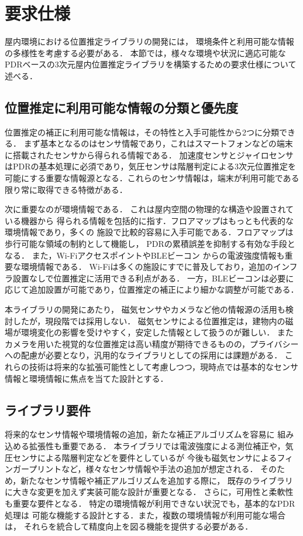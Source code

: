 

\section{要求仕様}

屋内環境における位置推定ライブラリの開発には，
環境条件と利用可能な情報の多様性を考慮する必要がある．
本節では，様々な環境や状況に適応可能なPDRベースの3次元屋内位置推定ライブラリを構築するための要求仕様について述べる．

\subsection{位置推定に利用可能な情報の分類と優先度}

位置推定の補正に利用可能な情報は，その特性と入手可能性から2つに分類できる．
まず基本となるのはセンサ情報であり，これはスマートフォンなどの端末に搭載されたセンサから得られる情報である．
加速度センサとジャイロセンサはPDRの基本処理に必須であり，気圧センサは階層判定による3次元位置推定を可能にする重要な情報源となる．これらのセンサ情報は，端末が利用可能である限り常に取得できる特徴がある．

次に重要なのが環境情報である．
これは屋内空間の物理的な構造や設置されている機器から
得られる情報を包括的に指す．フロアマップはもっとも代表的な環境情報であり，多くの
施設で比較的容易に入手可能である．フロアマップは歩行可能な領域の制約として機能し，
PDRの累積誤差を抑制する有効な手段となる．
また，Wi-FiアクセスポイントやBLEビーコン
からの電波強度情報も重要な環境情報である．
Wi-Fiは多くの施設にすでに普及しており，追加のインフラ設置なしで位置推定に活用できる利点がある．
一方，BLEビーコンは必要に応じて追加設置が可能であり，位置推定の補正により細かな調整が可能である．

本ライブラリの開発にあたり，
磁気センサやカメラなど他の情報源の活用も検討したが，現段階では採用しない．
磁気センサによる位置推定は，建物内の磁場が環境変化の影響を受けやすく，安定した情報として扱うのが難しい．
またカメラを用いた視覚的な位置推定は高い精度が期待できるものの，プライバシーへの配慮が必要となり，汎用的なライブラリとしての採用には課題がある．
これらの技術は将来的な拡張可能性として考慮しつつ，現時点では基本的なセンサ情報と環境情報に焦点を当てた設計とする．

\subsection{ライブラリ要件}

将来的なセンサ情報や環境情報の追加，新たな補正アルゴリズムを容易に
組み込める拡張性も重要である．
本ライブラリでは電波強度による測位補正や，気圧センサによる階層判定などを要件としているが
今後も磁気センサによるフィンガープリントなど，様々なセンサ情報や手法の追加が想定される．
そのため，新たなセンサ情報や補正アルゴリズムを追加する際に，
既存のライブラリに大きな変更を加えず実装可能な設計が重要となる．
さらに，可用性と柔軟性も重要な要件となる．
特定の環境情報が利用できない状況でも，基本的なPDR処理は
可能な機能する設計とする．また，複数の環境情報が利用可能な場合は，
それらを統合して精度向上を図る機能を提供する必要がある．



